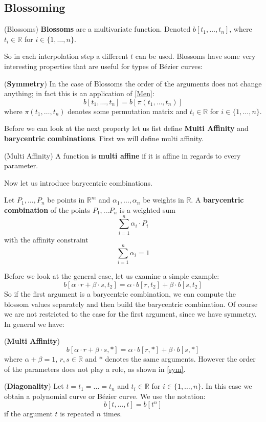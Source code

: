 \subsection{Blossoming}
\begin{definition}(Blossoms)
\textbf{Blossoms} are a multivariate function. Denoted $b[t_1, \dots, t_n]$, where $t_i \in \mathbb{R}$ for $i \in \{1, \dots, n\}$. 
\end{definition}
So in each interpolation step a different $t$ can be used.
Blossoms have some very interesting properties that are useful for types of Bézier curves:
\begin{lem}\label{sym}(\textbf{Symmetry})
In the case of Blossoms the order of the arguments does not change anything; in fact this is an application of \cref{Men}:
\[b[t_1, \dots, t_n] = b[\pi(t_1, \dots, t_n)]\]
where $\pi(t_1, \dots, t_n)$ denotes some permutation matrix and $t_i \in \mathbb{R}$ for $i \in \{1, \dots, n\}$.
\end{lem}
Before we can look at the next property let us fist define \textbf{Multi Affinity} and \textbf{barycentric combinations}.
First we will define multi affinity.
\begin{definition}(Multi Affinity)
A function is \textbf{multi affine} if it is affine in regards to every parameter.
\end{definition}
Now let us introduce barycentric combinations.
\begin{definition}
Let $P_1, \dots, P_n$ be points in $\mathbb{R}^m$ and $\alpha_1, \dots, \alpha_n$ be weights in $\mathbb{R}$.
A \textbf{barycentric combination} of the points $P_1, \dots P_n$ is a weighted sum\[\sum_{i=1}^n \alpha_i \cdot P_i\] with the affinity constraint
\[\sum_{i=1}^n \alpha_i = 1\]
\end{definition}
 Before we look at the general case, let us examine a simple example:
\[b[\alpha \cdot r + \beta \cdot s, t_2] = \alpha \cdot b[r, t_2] + \beta \cdot b[s, t_2]\]
So if the first argument is a barycentric combination, we can compute the blossom values separately and then build the barycentric combination. Of course we are not restricted to the case for the first argument, since we have symmetry. In general we have:
\begin{lem}(\textbf{Multi Affinity})
\[b[\alpha \cdot r + \beta \cdot s, *] = \alpha \cdot b[r, *] + \beta \cdot b[s, *]\]
where $\alpha + \beta = 1$, $r,s \in \mathbb{R}$ and $*$ denotes the same arguments. However the order of the parameters does not play a role, as shown in \cref{sym}.
\end{lem}
\begin{rem}(\textbf{Diagonality})
Let $t = t_1 = \dots = t_n$ and $t_i \in \mathbb{R}$ for $i \in \{1, \dots, n\}$. In this case we obtain a polynomial curve or Bézier curve. We use the notation:
\[b[t, \dots, t] = b[t^n]\]
if the argument $t$ is repeated $n$ times.
\end{rem}
\newpage
